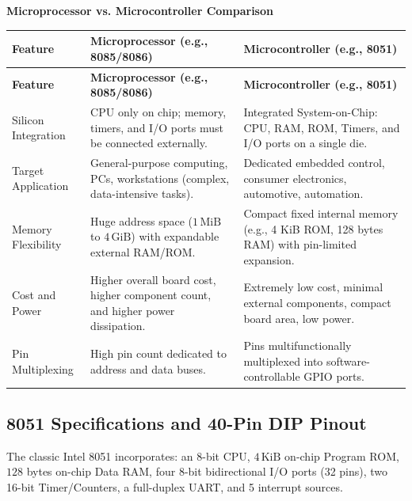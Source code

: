 \documentclass[12pt,a4paper]{article}
\begin{document}
\begingroup
\par\smallskip\noindent \textbf{Microprocessor vs. Microcontroller Comparison}\par\nobreak
\par\vspace{2pt}
\begingroup
\setlength{\extrarowheight}{2.5pt}
\begingroup
\setlength{\LTleft}{0pt}
\setlength{\LTright}{0pt}
\begin{longtable}{|B{3.2cm}|>{\small\raggedright\arraybackslash}m{\dimexpr(\linewidth-3.2cm-6\arrayrulewidth)/2\relax}|>{\small\raggedright\arraybackslash}m{\dimexpr(\linewidth-3.2cm-6\arrayrulewidth)/2\relax}|}
\hline
\textbf{Feature} & \textbf{Microprocessor (e.g., 8085/8086)} & \textbf{Microcontroller (e.g., 8051)} \\ \hline
\endfirsthead
\hline
\textbf{Feature} & \textbf{Microprocessor (e.g., 8085/8086)} & \textbf{Microcontroller (e.g., 8051)} \\ \hline
\endhead
Silicon Integration & CPU only on chip; memory, timers, and I/O ports must be connected externally. & Integrated System-on-Chip: CPU, RAM, ROM, Timers, and I/O ports on a single die. \\ \hline
Target Application & General-purpose computing, PCs, workstations (complex, data-intensive tasks). & Dedicated embedded control, consumer electronics, automotive, automation. \\ \hline
Memory Flexibility & Huge address space ($1\,\mathrm{MiB}$ to $4\,\mathrm{GiB}$) with expandable external RAM/ROM. & Compact fixed internal memory (e.g., 4 KiB ROM, 128 bytes RAM) with pin-limited expansion. \\ \hline
Cost and Power & Higher overall board cost, higher component count, and higher power dissipation. & Extremely low cost, minimal external components, compact board area, low power. \\ \hline
Pin Multiplexing & High pin count dedicated to address and data buses. & Pins multifunctionally multiplexed into software-controllable GPIO ports. \\ \hline
\end{longtable}
\endgroup\par
\endgroup
\endgroup

\subsection{8051 Specifications and 40-Pin DIP Pinout}
The classic Intel 8051 incorporates: an 8-bit CPU, $4\,\mathrm{KiB}$ on-chip Program ROM, $128$ bytes on-chip Data RAM, four 8-bit bidirectional I/O ports (32 pins), two 16-bit Timer/Counters, a full-duplex UART, and 5 interrupt sources.
\end{document}
